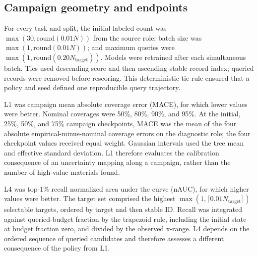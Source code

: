 \documentclass[10pt,twocolumn]{article}
\begin{document}
\subsection{Campaign geometry and endpoints}
For every task and split, the initial labeled count was
$\max(30,\mathrm{round}(0.01N))$ from the source role; batch size was
$\max(1,\mathrm{round}(0.01N))$; and maximum queries were
$\max(1,\mathrm{round}(0.20N_{\mathrm{target}}))$. Models were retrained after
each simultaneous batch. Ties used descending score and then ascending stable
record index; queried records were removed before rescoring. This deterministic
tie rule ensured that a policy and seed defined one reproducible query
trajectory.

L1 was campaign mean absolute coverage error (MACE), for which lower values
were better. Nominal coverages were 50\%, 80\%, 90\%, and 95\%. At the
initial, 25\%, 50\%, and 75\% campaign checkpoints, MACE was the mean of the
four absolute empirical-minus-nominal coverage errors on the diagnostic role;
the four checkpoint values received equal weight. Gaussian intervals used the
tree mean and effective standard deviation. L1 therefore evaluates the
calibration consequence of an uncertainty mapping along a campaign, rather
than the number of high-value materials found.

L4 was top-1\% recall normalized area under the curve (nAUC), for which higher
values were better. The target set comprised the highest
$\max(1,\lceil0.01N_{\mathrm{target}}\rceil)$ selectable targets, ordered by
target and then stable ID. Recall was integrated against queried-budget
fraction by the trapezoid rule, including the initial state at budget fraction
zero, and divided by the observed x-range. L4 depends on the ordered sequence
of queried candidates and therefore assesses a different consequence of the
policy from L1.
\end{document}
